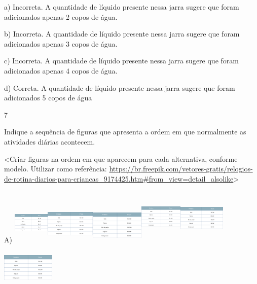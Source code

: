 \begin{escolha}
\begin{escolha}
{{{{{{{{a) Incorreta. A quantidade de líquido presente nessa jarra sugere que
foram adicionados apenas 2 copos de água.

b) Incorreta. A quantidade de líquido presente nessa jarra sugere que
foram adicionados apenas 3 copos de água.

c) Incorreta. A quantidade de líquido presente nessa jarra sugere que
foram adicionados apenas 4 copos de água.

d) Correta. A quantidade de líquido presente nessa jarra sugere que
foram adicionados 5 copos de água

\num{7}

Indique a sequência de figuras que apresenta a ordem em que normalmente as
atividades diárias acontecem.

\textless{}Criar figuras na ordem em que aparecem para cada alternativa,
conforme modelo. Utilizar como referência:
\url{https://br.freepik.com/vetores-gratis/relogios-de-rotina-diarios-para-criancas_9174425.htm\#from_view=detail_alsolike}\textgreater{}

A)
\includegraphics[width=0.68193in,height=0.81736in]{media/image148.png}\includegraphics[width=0.92914in,height=0.77678in]{media/image148.png}\includegraphics[width=1.00005in,height=0.71336in]{media/image148.png}\includegraphics[width=0.80414in,height=1.05999in]{media/image148.png}\includegraphics[width=0.86664in,height=1.01803in]{media/image148.png}\includegraphics[width=0.99167in,height=0.93413in]{media/image148.png}

}}}}}}}}
\end{escolha}
\end{escolha}
